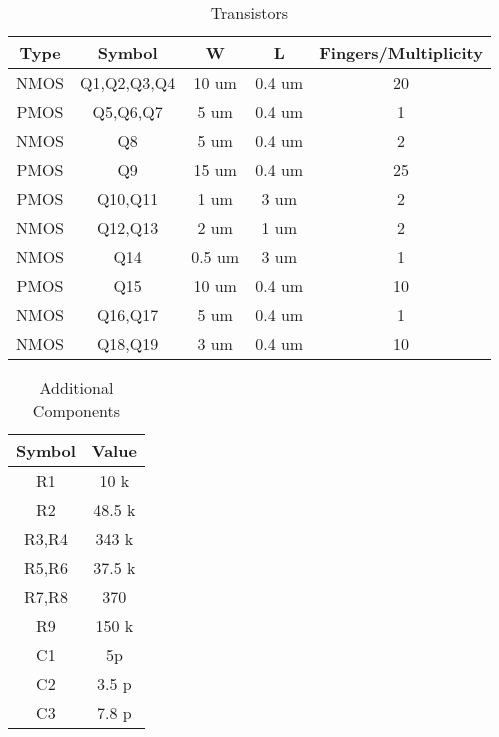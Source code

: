 \begin{table}[h]
\centering
\caption{Transistors}
\label{trans_specs}
\begin{tabular}{c|c|c|c|c}
\textbf{Type}  & \textbf{Symbol}& \textbf{W}  & \textbf{L}  & \textbf{Fingers/Multiplicity}  \\ \hline
NMOS                 & Q1,Q2,Q3,Q4    & 10 um       & 0.4 um      & 20                \\
PMOS                 & Q5,Q6,Q7       & 5 um        & 0.4 um      & 1                 \\
NMOS                 & Q8             & 5 um        & 0.4 um      & 2                 \\
PMOS                 & Q9             & 15 um       & 0.4 um      & 25                \\
PMOS                 & Q10,Q11        & 1 um        & 3 um        & 2                 \\
NMOS                 & Q12,Q13        & 2 um        & 1 um        & 2                 \\
NMOS                 & Q14            & 0.5 um      & 3 um        & 1                 \\
PMOS                 & Q15            & 10 um       & 0.4 um      & 10                \\
NMOS                 & Q16,Q17        & 5 um        & 0.4 um      & 1                 \\
NMOS                 & Q18,Q19        & 3 um        & 0.4 um      & 10                \\
\end{tabular}
\end{table}

\begin{table}[h]
\centering
\caption{Additional Components}
\label{res_specs}
\begin{tabular}{c|c}
\textbf{Symbol} & \textbf{Value} \\ \hline
R1              & 10 k           \\
R2              & 48.5 k         \\
R3,R4           & 343 k          \\
R5,R6           & 37.5 k         \\
R7,R8           & 370            \\
R9              & 150 k           \\
C1              & 5p             \\
C2              & 3.5 p          \\
C3              & 7.8 p          \\


\end{tabular}
\end{table}